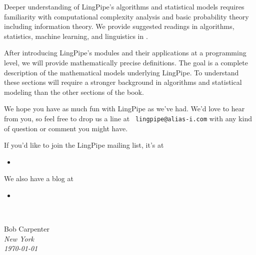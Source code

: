 Deeper understanding of LingPipe's algorithms and statistical models
requires familiarity with computational complexity analysis and basic
probability theory including information theory.  We provide suggested
readings in algorithms, statistics, machine learning, and linguistics
in .

After introducing LingPipe's modules and their applications at a
programming level, we will provide mathematically precise definitions.
The goal is a complete description of the mathematical models
underlying LingPipe.  To understand these sections will require a
stronger background in algorithms and statistical modeling than
the other sections of the book.

We hope you have as much fun with LingPipe as we've had.
We'd love to hear from you, so feel free to drop us a line at {\tt
lingpipe@alias-i.com} with any kind of question or comment you might
have.

\begin{samepage}
\noindent
If you'd like to join the LingPipe mailing list, it's at
\begin{itemize}
\item
{}
\end{itemize}
\end{samepage}
%
We also have a blog at
\begin{itemize}
\item
{}
\end{itemize}



\newlength{\sigWidth}
\mbox{ }
\hfill
\parbox{\sigWidth}{
Bob Carpenter
\\[2pt]\small
\it New York
\\
\today}
